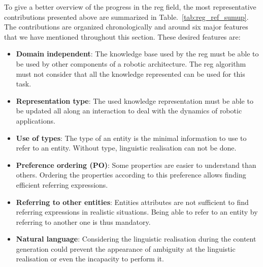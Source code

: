 To give a better overview of the progress in the \acrshort{reg} field, the most representative contributions presented above are summarized in Table.~\ref{tab:reg_ref_sumup}. The contributions are organized chronologically and around six major features that we have mentioned throughout this section. These desired features are:
\begin{itemize}
	\item \textbf{Domain independent}: The knowledge base used by the \acrshort{reg} must be able to be used by other components of a robotic architecture. The \acrshort{reg} algorithm must not consider that all the knowledge represented can be used for this task.
	\item \textbf{Representation type}: The used knowledge representation must be able to be updated all along an interaction to deal with the dynamics of robotic applications.
	\item \textbf{Use of types}: The type of an entity is the minimal information to use to refer to an entity. Without type, linguistic realisation can not be done.
	\item \textbf{Preference ordering (PO)}: Some properties are easier to understand than others. Ordering the properties according to this preference allows finding efficient referring expressions.
	\item \textbf{Referring to other entities}: Entities attributes are not sufficient to find referring expressions in realistic situations. Being able to refer to an entity by referring to another one is thus mandatory.
	\item \textbf{Natural language}: Considering the linguistic realisation during the content generation could prevent the appearance of ambiguity at the linguistic realisation or even the incapacity to perform it.
\end{itemize}

